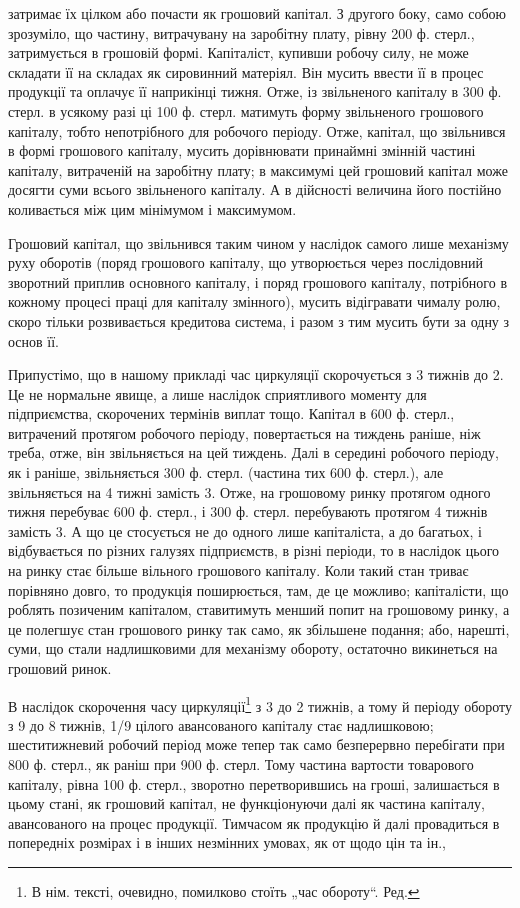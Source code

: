 \parcont{}  %
затримає їх цілком або почасти як грошовий капітал. З другого боку,
само собою зрозуміло, що частину, витрачувану на заробітну плату,
рівну 200 ф. стерл., затримується в грошовій формі. Капіталіст, купивши
робочу силу, не може складати її на складах як сировинний матеріял.
Він мусить ввести її в процес продукції та оплачує її наприкінці тижня.
Отже, із звільненого капіталу в 300 ф. стерл. в усякому разі ці 100 ф.
стерл. матимуть форму звільненого грошового капіталу, тобто непотрібного
для робочого періоду. Отже, капітал, що звільнився в формі грошового
капіталу, мусить дорівнювати принаймні змінній частині капіталу,
витраченій на заробітну плату; в максимумі цей грошовий капітал може
досягти суми всього звільненого капіталу. А в дійсності величина його
постійно коливається між цим мінімумом і максимумом.

Грошовий капітал, що звільнився таким чином у наслідок самого
лише механізму руху оборотів (поряд грошового капіталу, що утворюється
через послідовний зворотний приплив основного капіталу, і поряд грошового
капіталу, потрібного в кожному процесі праці для капіталу змінного),
мусить відігравати чималу ролю, скоро тільки розвивається кредитова
система, і разом з тим мусить бути за одну з основ її.

Припустімо, що в нашому прикладі час циркуляції скорочується
з 3 тижнів до 2. Це не нормальне явище, а лише наслідок сприятливого
моменту для підприємства, скорочених термінів виплат тощо. Капітал
в 600 ф. стерл., витрачений протягом робочого періоду, повертається на
тиждень раніше, ніж треба, отже, він звільняється на цей тиждень. Далі
в середині робочого періоду, як і раніше, звільняється 300 ф. стерл.
(частина тих 600 ф. стерл.), але звільняється на 4 тижні замість 3.
Отже, на грошовому ринку протягом одного тижня перебуває 600 ф.
стерл., і 300 ф. стерл. перебувають протягом 4 тижнів замість 3. А що це
стосується не до одного лише капіталіста, а до багатьох, і відбувається по
різних галузях підприємств, в різні періоди, то в наслідок цього на ринку
стає більше вільного грошового капіталу. Коли такий стан триває порівняно
довго, то продукція поширюється, там, де це можливо; капіталісти,
що роблять позиченим капіталом, ставитимуть менший попит на грошовому
ринку, а це полегшує стан грошового ринку так само, як збільшене
подання; або, нарешті, суми, що стали надлишковими для механізму
обороту, остаточно викинеться на грошовий ринок.

В наслідок скорочення часу циркуляції\footnote*{
В нім. тексті, очевидно, помилково стоїть „час обороту“. Ред.
} з 3 до 2 тижнів, а тому й
періоду обороту з 9 до 8 тижнів, 1/9 цілого авансованого капіталу
стає надлишковою; шеститижневий робочий період може тепер так само
безперервно перебігати при 800 ф. стерл., як раніш при 900 ф. стерл.
Тому частина вартости товарового капіталу, рівна 100 ф. стерл., зворотно
перетворившись на гроші, залишається в цьому стані, як грошовий
капітал, не функціонуючи далі як частина капіталу, авансованого на
процес продукції. Тимчасом як продукцію й далі провадиться в попередніх
розмірах і в інших незмінних умовах, як от щодо цін та ін.,
\parbreak{}  %

